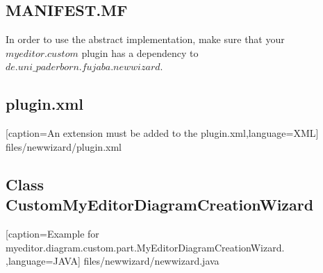 \subsection {MANIFEST.MF}
In order to use the abstract implementation, make sure that your
$myeditor.custom$ plugin has a dependency to
$de.uni\_paderborn.fujaba.newwizard$.

\subsection {plugin.xml}

[caption={An extension must be added to the
plugin.xml}\label{lst:javaclass},language=XML]
{files/newwizard/plugin.xml}


\subsection {Class CustomMyEditorDiagramCreationWizard}

[caption={Example for
myeditor.diagram.custom.part.MyEditorDiagramCreationWizard.}
\label{lst:javaclass},language=JAVA] {files/newwizard/newwizard.java}
